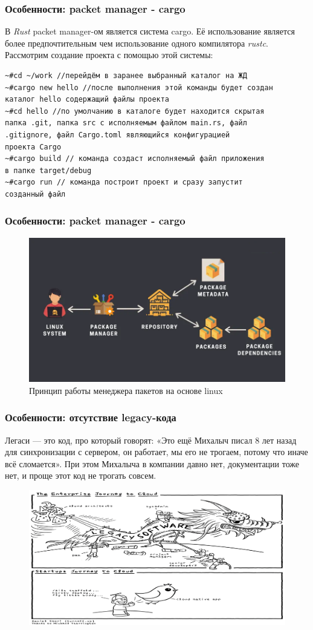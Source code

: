 \documentclass[11pt]{beamer}
\begin{document}
\begin{frame}[fragile]
\frametitle{Особенности: {\color{orange}packet manager - cargo}}
В \textit{Rust} {\color{orange}packet manager-ом} является система {\color{orange}cargo}. Её использование является более предпочтительным чем использование одного компилятора \textit{rustc}. Рассмотрим создание проекта с помощью этой системы:
\begin{verbatim}
~#cd ~/work //перейдём в заранее выбранный каталог на ЖД
~#cargo new hello //после выполнения этой команды будет создан 
каталог hello содержащий файлы проекта
~#cd hello //по умолчанию в каталоге будет находится скрытая
папка .git, папка src с исполняемым файлом main.rs, файл 
.gitignore, файл Cargo.toml являющийся конфигурацией
проекта Cargo
~#cargo build // команда создаст исполняемый файл приложения
в папке target/debug
~#cargo run // команда построит проект и сразу запустит 
созданный файл
\end{verbatim}
\end{frame}
\begin{frame}
\frametitle{Особенности: {\color{orange}packet manager - cargo}}
\begin{figure}
    \centering
    \includegraphics[width=0.7\linewidth]{image6.png}
    \caption{Принцип работы менеджера пакетов на основе linux}
\end{figure}
\centering
\end{frame}
\begin{frame}
\frametitle{Особенности: отсутствие legacy-кода}
Легаси — это код, про который говорят: «Это ещё Михалыч писал 8 лет назад для синхронизации с сервером, он работает, мы его не трогаем, потому что иначе всё сломается». При этом Михалыча в компании давно нет, документации тоже нет, и проще этот код не трогать совсем.
\begin{figure}
    \centering
    \includegraphics[width=0.85\linewidth]{image8.png}
\end{figure}
\end{frame}
\end{document}
